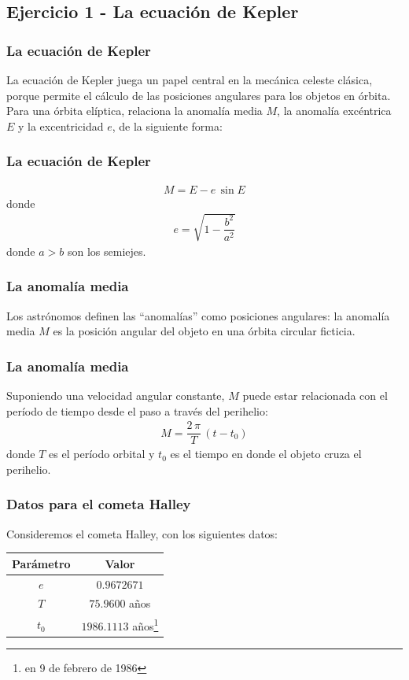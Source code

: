 \subsection{Ejercicio 1 - La ecuación de Kepler}
\begin{frame}
\frametitle{La ecuación de Kepler}
La ecuación de Kepler juega un papel central en la mecánica celeste clásica, porque permite el cálculo de las posiciones angulares para los objetos en órbita.
\\
\bigskip
Para una órbita elíptica, relaciona la anomalía media $M$, la anomalía excéntrica $E$ y la excentricidad $e$, de la siguiente forma:
\end{frame}
\begin{frame}
\frametitle{La ecuación de Kepler}
\begin{align}
M = E - e \, \sin E
\label{eq:ecuacion_6_58}
\end{align}
donde
\begin{align*}
e = \sqrt{1 - \dfrac{b^{2}}{a^{2}}}
\end{align*}
donde $a > b$ son los semiejes.
\end{frame}
\begin{frame}
\frametitle{La anomalía media}
Los astrónomos definen las \enquote{anomalías} como posiciones angulares: la anomalía media $M$ es la posición angular del objeto en una órbita circular ficticia.
\end{frame}
\begin{frame}
\frametitle{La anomalía media}
Suponiendo una velocidad angular constante, $M$ puede estar relacionada con el período de tiempo desde el paso a través del perihelio:
\begin{align}
M = \dfrac{2 \, \pi}{T} \, (t - t_{0})
\label{eq:ecuacion_6_59}
\end{align}
donde $T$ es el período orbital y $t_{0}$ es el tiempo en donde el objeto cruza el perihelio.
\end{frame}
\begin{frame}
\frametitle{Datos para el cometa Halley}
Consideremos el cometa Halley, con los siguientes datos:
\begin{table}
\centering
\begin{tabular}{c c}
Parámetro & Valor \\ \hline
$e$ & $0.9672671$ \\ \hline
$T$ & $75.9600$ años \\ \hline
$t_{0}$ & $1986.1113$ años\footnote{en 9 de febrero de 1986} \\ \hline
\end{tabular}
\end{table}
\end{frame}
